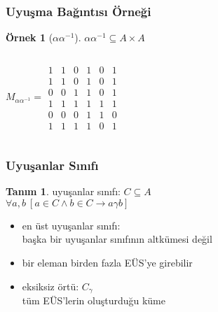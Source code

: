 \documentclass[dvipsnames]{beamer}
\theoremstyle{definition}
\newtheorem{tanim}[theorem]{Tanım}
\theoremstyle{example}
\newtheorem{ornek}[theorem]{Örnek}
\theoremstyle{plain}
\begin{document}
\begin{frame}
  \frametitle{Uyuşma Bağıntısı Örneği}

  \begin{ornek}[$\alpha \alpha^{-1}$]
    $\alpha \alpha^{-1} \subseteq A \times A$

    \begin{columns}
      \[
        M_{\alpha \alpha^{-1}} =
          \begin{array}{|cccccc|}
            1  &  1  &  0  &  1  &  0  &  1\\
            1  &  1  &  0  &  1  &  0  &  1\\
            0  &  0  &  1  &  1  &  0  &  1\\
            1  &  1  &  1  &  1  &  1  &  1\\
            0  &  0  &  0  &  1  &  1  &  0\\
            1  &  1  &  1  &  1  &  0  &  1
          \end{array}
      \]

      \begin{center}
      \end{center}
    \end{columns}
  \end{ornek}
\end{frame}

\begin{frame}
  \frametitle{Uyuşanlar Sınıfı}

  \begin{tanim}
    \alert{uyuşanlar sınıfı}: $C \subseteq A$\\
      $\forall a,b~[a \in C \wedge b \in C \rightarrow a \gamma b]$
  \end{tanim}

  \pause
  \medskip
  \begin{itemize}
    \item \alert{en üst uyuşanlar sınıfı}:\\
      başka bir uyuşanlar sınıfının altkümesi değil
    \item bir eleman birden fazla EÜS'ye girebilir

    \pause
    \medskip
    \item \alert{eksiksiz örtü}: $C_\gamma$\\
      tüm EÜS'lerin oluşturduğu küme
  \end{itemize}
\end{frame}
\end{document}
